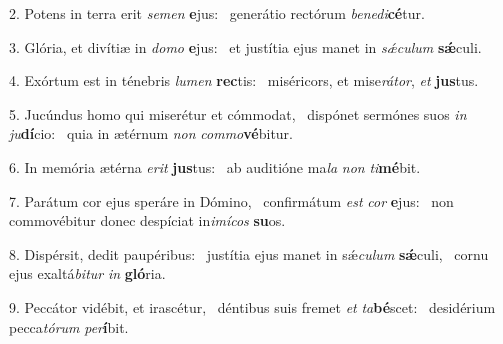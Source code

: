 2. Potens in terra erit \textit{se}\textit{men} \textbf{e}jus: \ast\  generátio rectórum \textit{be}\textit{ne}\textit{di}\textbf{cé}tur.\

3. Glória, et divítiæ in \textit{do}\textit{mo} \textbf{e}jus: \ast\  et justítia ejus manet in \textit{sǽ}\textit{cu}\textit{lum} \textbf{sǽ}culi.\

4. Exórtum est in ténebris \textit{lu}\textit{men} \textbf{rec}tis: \ast\  miséricors, et mise\textit{rá}\textit{tor}, \textit{et} \textbf{jus}tus.\

5. Jucúndus homo qui miserétur et cómmodat, \dag\  dispónet sermónes suos \textit{in} \textit{ju}\textbf{dí}cio: \ast\  quia in ætérnum \textit{non} \textit{com}\textit{mo}\textbf{vé}bitur.\

6. In memória ætérna \textit{e}\textit{rit} \textbf{jus}tus: \ast\  ab auditióne ma\textit{la} \textit{non} \textit{ti}\textbf{mé}bit.\

7. Parátum cor ejus speráre in Dómino, \dag\  confirmátum \textit{est} \textit{cor} \textbf{e}jus: \ast\  non commovébitur donec despíciat in\textit{i}\textit{mí}\textit{cos} \textbf{su}os.\

8. Dispérsit, dedit paupéribus: \dag\  justítia ejus manet in sǽ\textit{cu}\textit{lum} \textbf{sǽ}culi, \ast\  cornu ejus exaltá\textit{bi}\textit{tur} \textit{in} \textbf{gló}ria.\

9. Peccátor vidébit, et irascétur, \dag\  déntibus suis fremet \textit{et} \textit{ta}\textbf{bé}scet: \ast\  desidérium pecca\textit{tó}\textit{rum} \textit{per}\textbf{í}bit.\

